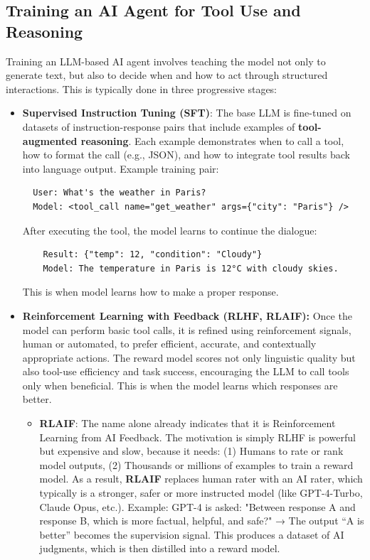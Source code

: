 \documentclass[11pt]{article}  %
\begin{document}
\subsection{Training an AI Agent for Tool Use and Reasoning}
Training an LLM-based AI agent involves teaching the model not only to generate text, but also to decide when and how to act through structured interactions.
This is typically done in three progressive stages:

\begin{itemize}
  \item \textbf{Supervised Instruction Tuning (SFT)}: The base LLM is fine-tuned on datasets of instruction-response pairs that include examples of \textbf{tool-augmented reasoning}. 
  Each example demonstrates when to call a tool, how to format the call (e.g., JSON), and how to integrate tool results back into language output. 
  Example training pair:
  \begin{verbatim}
  User: What's the weather in Paris?
  Model: <tool_call name="get_weather" args={"city": "Paris"} />
  \end{verbatim}
  After executing the tool, the model learns to continue the dialogue:
  \begin{verbatim}
    Result: {"temp": 12, "condition": "Cloudy"}
    Model: The temperature in Paris is 12°C with cloudy skies.
  \end{verbatim}
  This is when model learns how to make a proper response.

  \item \textbf{Reinforcement Learning with Feedback (RLHF, RLAIF):} Once the model can perform basic tool calls, it is refined using reinforcement signals, human or automated, to prefer efficient, accurate, and contextually appropriate actions.
  The reward model scores not only linguistic quality but also tool-use efficiency and task success, encouraging the LLM to call tools only when beneficial.
  This is when the model learns which responses are better.

  \begin{itemize}
    \item \textbf{RLAIF}: The name alone already indicates that it is Reinforcement Learning from AI Feedback.
    The motivation is simply RLHF is powerful but expensive and slow, because it needs: (1) Humans to rate or rank model outputs, (2) Thousands or millions of examples to train a reward model.
    As a result, \textbf{RLAIF} replaces human rater with an AI rater, which typically is a stronger, safer or more instructed model (like GPT-4-Turbo, Claude Opus, etc.).
    Example: GPT-4 is asked:
    "Between response A and response B, which is more factual, helpful, and safe?"
    → The output “A is better” becomes the supervision signal.
    This produces a dataset of AI judgments, which is then distilled into a reward model.


\end{itemize}
\end{itemize}
\end{document}
